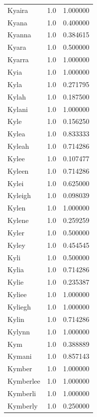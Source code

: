 \documentclass[
  letterpaper,
  DIV=11,
  numbers=noendperiod]{scrreprt}
\begin{document}
\begin{tabular}{lrr}
Kyaira          &   1.0 &   1.000000 \\
Kyana           &   1.0 &   0.400000 \\
Kyanna          &   1.0 &   0.384615 \\
Kyara           &   1.0 &   0.500000 \\
Kyarra          &   1.0 &   1.000000 \\
Kyia            &   1.0 &   1.000000 \\
Kyla            &   1.0 &   0.271795 \\
Kylah           &   1.0 &   0.187500 \\
Kylani          &   1.0 &   1.000000 \\
Kyle            &   1.0 &   0.156250 \\
Kylea           &   1.0 &   0.833333 \\
Kyleah          &   1.0 &   0.714286 \\
Kylee           &   1.0 &   0.107477 \\
Kyleen          &   1.0 &   0.714286 \\
Kylei           &   1.0 &   0.625000 \\
Kyleigh         &   1.0 &   0.098039 \\
Kylen           &   1.0 &   1.000000 \\
Kylene          &   1.0 &   0.259259 \\
Kyler           &   1.0 &   0.500000 \\
Kyley           &   1.0 &   0.454545 \\
Kyli            &   1.0 &   0.500000 \\
Kylia           &   1.0 &   0.714286 \\
Kylie           &   1.0 &   0.235387 \\
Kyliee          &   1.0 &   1.000000 \\
Kyliegh         &   1.0 &   1.000000 \\
Kylin           &   1.0 &   0.714286 \\
Kylynn          &   1.0 &   1.000000 \\
Kym             &   1.0 &   0.388889 \\
Kymani          &   1.0 &   0.857143 \\
Kymber          &   1.0 &   1.000000 \\
Kymberlee       &   1.0 &   1.000000 \\
Kymberli        &   1.0 &   1.000000 \\
Kymberly        &   1.0 &   0.250000 \\

\end{tabular}
\end{document}
